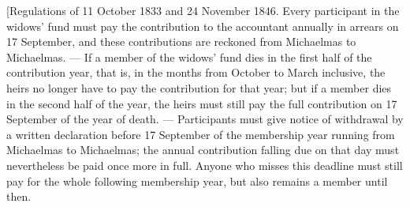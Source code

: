 \noindent\hspace*{1.2em} [Regulations of 11 October 1833 and 24 November 1846. Every participant in the widows' fund must pay the contribution to the accountant annually in arrears on 17 September, and these contributions are reckoned from Michaelmas to Michaelmas. — If a member of the widows' fund dies in the first half of the contribution year, that is, in the months from October to March inclusive, the heirs no longer have to pay the contribution for that year; but if a member dies in the second half of the year, the heirs must still pay the full contribution on 17 September of the year of death. — Participants must give notice of withdrawal by a written declaration before 17 September of the membership year running from Michaelmas to Michaelmas; the annual contribution falling due on that day must nevertheless be paid once more in full. Anyone who misses this deadline must still pay for the whole following membership year, but also remains a member until then.

